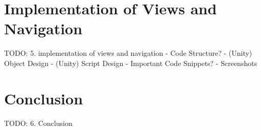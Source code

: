 \section{Implementation of Views and Navigation}


TODO:
5. implementation of views and navigation
- Code Structure?
- (Unity) Object Design
- (Unity) Script Design
- Important Code Snippets?
- Screenshots




\section{Conclusion}


TODO:
6. Conclusion





